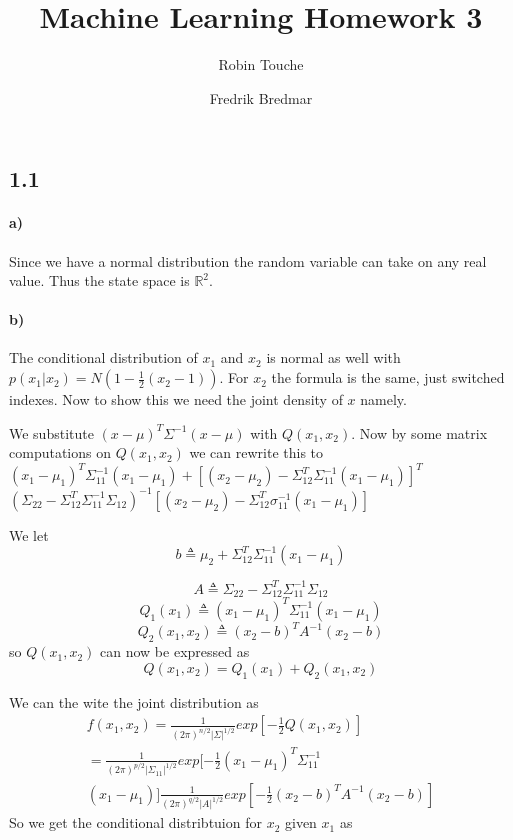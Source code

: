 \documentclass{article}
\author{
  Robin Touche \\
  \and
  Fredrik Bredmar
}
\title{Machine Learning Homework 3}
\begin{document}
\maketitle

\subsection*{1.1}
\paragraph{a)}

Since we have a normal distribution the random variable can take on any real
value. Thus the state space is $\mathbb{R}^2$.

\paragraph{b)}

The conditional distribution of $x_1$ and $x_2$ is normal as well with
$p(x_1|x_2) = N(1 - \frac{1}{2}(x_2 - 1))$. For $x_2$ 
the formula is the same, just switched indexes. 
Now to show this we need the joint density of $x$ namely.
      
We substitute $(x-\mu)^T\Sigma^{-1}(x-\mu)$ with $Q(x_1,x_2)$. 
Now by some matrix computations on $Q(x_1,x_2)$ we can rewrite this to 
$(x_1 - \mu_1)^T\Sigma_{11}^{-1}(x_1 - \mu_1) +
[(x_2 - \mu_2) - \Sigma^T_{12}\Sigma^{-1}_11(x_1 - \mu_1)]^T$
$(\Sigma_{22} - \Sigma^T_{12}\Sigma_{11}^{-1}\Sigma_{12})^{-1}
[(x_2 - \mu_2) - \Sigma^T_{12}\sigma^{-1}_{11}(x_1 - \mu_1)]$ 

We let $$ b \triangleq \mu_2 + \Sigma^T_{12}\Sigma_{11}^{-1}(x_1 - \mu_1) $$

$$ A \triangleq \Sigma_{22} - \Sigma_{12}^T\Sigma_{11}^{-1}\Sigma_{12}$$
$$Q_1(x_1) \triangleq (x_1-\mu_1)^T\Sigma_{11}^{-1}(x_1 - \mu_1)$$
$$Q_2(x_1,x_2) \triangleq (x_2 - b)^TA^{-1}(x_2 - b)$$
so $Q(x_1,x_2)$ can now be expressed as
$$Q(x_1,x_2) = Q_1(x_1) + Q_2(x_1,x_2)$$

We can the wite the joint distribution as
\begin{equation*}
  \begin{split}
 f(x_1,x_2) = \frac{1}{(2\pi)^{n/2}|\Sigma|^{1/2}}exp[-\frac{1}{2}Q(x_1,x_2)] \\ 
  = \frac{1}{(2\pi)^{p/2}|\Sigma_{11}|^{1/2}}exp[-\frac{1}{2}(x_1 - \mu_1)^T\Sigma_{11}^{-1}\\
  (x_1 - \mu_1)]\frac{1}{(2\pi)^{q/2}|A|^{1/2}}exp[-\frac{1}{2}(x_2-b)^TA^{-1}(x_2-b)]
\end{split}
\end{equation*}
So we get the conditional distribtuion for $x_2$ given $x_1$ as
\end{document}
